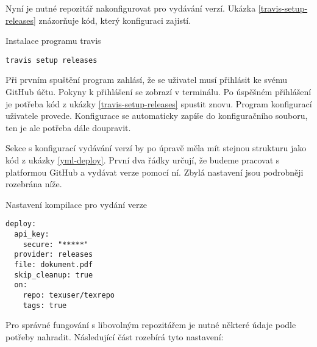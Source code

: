 \documentclass[a4paper]{article}
\begin{document}
Nyní je nutné repozitář nakonfigurovat pro vydávání verzí.
Ukázka \ref{travis-setup-releases} znázorňuje kód, který konfiguraci zajistí.

\begin{listing}[htbp]
\caption{\label{travis-setup-releases} Instalace programu travis}
\begin{verbatim}
travis setup releases
\end{verbatim}
\end{listing}

Při prvním spuštění program zahlásí, že se uživatel musí přihlásit ke svému GitHub účtu.
Pokyny k přihlášení se zobrazí v terminálu.
Po úspěšném přihlášení je potřeba kód z ukázky \ref{travis-setup-releases} spustit znovu.
Program konfigurací uživatele provede.
Konfigurace se automaticky zapíše do konfiguračního souboru, ten je ale potřeba dále doupravit.

Sekce s konfigurací vydávání verzí by po úpravě měla mít stejnou strukturu jako kód z ukázky \ref{yml-deploy}.
První dva řádky určují, že budeme pracovat s platformou GitHub a vydávat verze pomocí ní.
Zbylá nastavení jsou podrobněji rozebrána níže.

\begin{listing}[htbp]
\caption{\label{yml-deploy} Nastavení kompilace pro vydání verze}
\begin{verbatim}
deploy:
  api_key:
    secure: "*****"
  provider: releases
  file: dokument.pdf
  skip_cleanup: true
  on:
    repo: texuser/texrepo
    tags: true
\end{verbatim}
\end{listing}

Pro správné fungování s libovolným repozitářem je nutné některé údaje podle potřeby nahradit.
Následující část rozebírá tyto nastavení:
\end{document}
